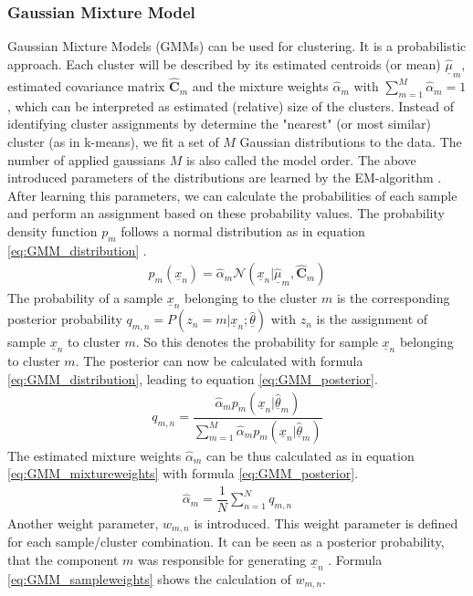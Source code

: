\documentclass[12pt,DIV14,BCOR12mm,a4paper,footexclude,headinclude,halfparskip-,twoside,openright,openany,cleardoubleempty,idxtotoc,bibtotoc]{scrreprt} %
\numberwithin{equation}{chapter}
\begin{document}
\subsubsection{Gaussian Mixture Model}
Gaussian Mixture Models (GMMs) can be used for clustering. It is a probabilistic approach. Each cluster will be described by its estimated centroids (or mean) $\hat{\underline{\mu}}_m$, estimated covariance matrix $\hat{\mathbf{C}}_m$ and the mixture weights $\hat{\alpha}_m$ with $\sum_{m=1}^{M}\hat{\alpha}_m=1$, which can be interpreted as estimated (relative) size of the clusters. Instead of identifying cluster assignments by determine the "nearest" (or most similar) cluster (as in k-means), we fit a set of $M$ Gaussian distributions to the data. The number of applied gaussians $M$ is also called the model order. The above introduced parameters of the distributions are learned by the EM-algorithm \cite{Dempster-et-al-1977}. After learning this parameters, we can calculate the probabilities of each sample and perform an assignment based on these probability values. The probability density function $p_m$ follows a normal distribution as in equation \ref{eq:GMM_distribution} \cite{Bishop}.
\begin{align}
	p_m(\underline{x}_n) = \hat{\alpha}_m\mathcal{N}(\underline{x}_n|\hat{\underline{\mu}}_m, \hat{\mathbf{C}}_m)\label{eq:GMM_distribution}
\end{align}
The probability of a sample $\underline{x}_n$ belonging to the cluster $m$ is the corresponding posterior probability $q_{m,n} = P(z_n = m|\underline{x}_n;\hat{\underline{\theta}})$ with $z_n$ is the assignment of sample $\underline{x}_n$ to cluster $m$. So this denotes the probability for sample $\underline{x}_n$ belonging to cluster $m$. The posterior can now be calculated with formula \ref{eq:GMM_distribution}, leading to equation \ref{eq:GMM_posterior}.
\begin{align}
	q_{m,n} = \dfrac{\hat{\alpha}_mp_m(\underline{x}_n|\hat{\underline{\theta}}_m)}{\sum_{m=1}^{M}\hat{\alpha}_mp_m(\underline{x}_n|\hat{\underline{\theta}}_m)}\label{eq:GMM_posterior}
\end{align}
The estimated mixture weights $\hat{\alpha}_m$ can be thus calculated as in equation \ref{eq:GMM_mixtureweights} with formula \ref{eq:GMM_posterior}.
\begin{align}
	\hat{\alpha}_m = \dfrac{1}{N}\sum_{n=1}^{N}q_{m,n}\label{eq:GMM_mixtureweights}
\end{align}
Another weight parameter, $w_{m,n}$ is introduced. This weight parameter is defined for each sample/cluster combination. It can be seen as a posterior probability, that the component $m$ was responsible for generating $\underline{x}_n$ \cite{Bishop}. Formula \ref{eq:GMM_sampleweights} shows the calculation of $w_{m,n}$.
\end{document}
